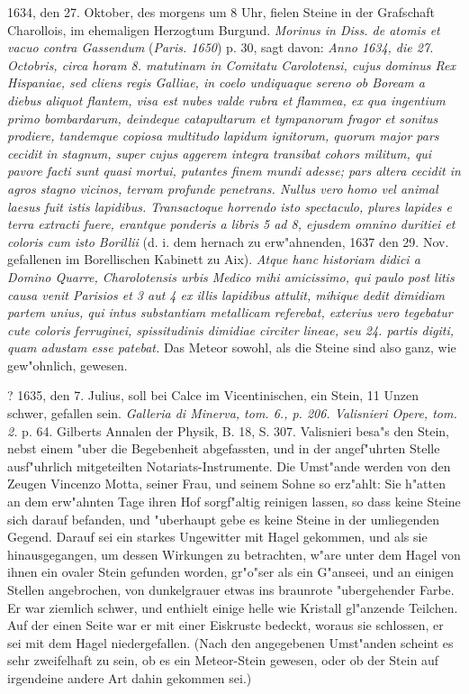 \documentclass[a4paper, 11pt, oneside, polutonikogreek, german]{article}
\begin{document}
1634, den 27. Oktober, des morgens um 8 Uhr, fielen Steine in der Grafschaft Charollois, im ehemaligen Herzogtum Burgund. \emph{Morinus in Diss. de atomis et vacuo contra Gassendum} (\emph{Paris. 1650}) p. 30, sagt davon: \emph{Anno 1634, die 27. Octobris, circa horam 8. matutinam in Comitatu Carolotensi, cujus dominus Rex Hispaniae, sed cliens regis Galliae, in coelo undiquaque sereno ob Boream a diebus aliquot flantem, visa est nubes valde rubra et flammea, ex qua ingentium primo bombardarum, deindeque catapultarum et tympanorum fragor et sonitus prodiere, tandemque copiosa multitudo lapidum ignitorum, quorum major pars cecidit in stagnum, super cujus aggerem integra transibat cohors militum, qui pavore facti sunt quasi mortui, putantes finem mundi adesse; pars altera cecidit in agros stagno vicinos, terram profunde penetrans. Nullus vero homo vel animal laesus fuit istis lapidibus. Transactoque horrendo isto spectaculo, plures lapides e terra extracti fuere, erantque ponderis a libris 5 ad 8, ejusdem omnino duritiei et coloris cum isto Borillii} (d. i. dem hernach zu erw"ahnenden, 1637 den 29. Nov. gefallenen im Borellischen Kabinett zu Aix). \emph{Atque hanc historiam didici a Domino Quarre, Charolotensis urbis Medico mihi amicissimo, qui paulo post litis causa venit Parisios et 3 aut 4 ex illis lapidibus attulit, mihique dedit dimidiam partem unius, qui intus substantiam metallicam referebat, exterius vero tegebatur cute coloris ferruginei, spissitudinis dimidiae circiter lineae, seu 24. partis digiti, quam adustam esse patebat.} Das Meteor sowohl, als die Steine sind also ganz, wie gew"ohnlich, gewesen.

? 1635, den 7. Julius, soll bei Calce im Vicentinischen, ein Stein, 11 Unzen schwer, gefallen sein. \emph{Galleria di Minerva, tom. 6., p. 206. Valisnieri Opere, tom. 2.} p. 64. Gilberts Annalen der Physik, B. 18, S. 307. Valisnieri besa"s den Stein, nebst einem "uber die Begebenheit abgefassten, und in der angef"uhrten Stelle ausf"uhrlich mitgeteilten Notariats-Instrumente. Die Umst"ande werden von den Zeugen Vincenzo Motta, seiner Frau, und seinem Sohne so erz"ahlt: Sie h"atten an dem erw"ahnten Tage ihren Hof sorgf"altig reinigen lassen, so dass keine Steine sich darauf befanden, und "uberhaupt gebe es keine Steine in der umliegenden Gegend. Darauf sei ein starkes Ungewitter mit Hagel gekommen, und als sie hinausgegangen, um dessen Wirkungen zu betrachten, w"are unter dem Hagel von ihnen ein ovaler Stein gefunden worden, gr"o"ser als ein G"anseei, und an einigen Stellen angebrochen, von dunkelgrauer etwas ins braunrote "ubergehender Farbe. Er war ziemlich schwer, und enthielt einige helle wie Kristall gl"anzende Teilchen. Auf der einen Seite war er mit einer Eiskruste bedeckt, woraus sie schlossen, er sei mit dem Hagel niedergefallen. (Nach den angegebenen Umst"anden scheint es sehr zweifelhaft zu sein, ob es ein Meteor-Stein gewesen, oder ob der Stein auf irgendeine andere Art dahin gekommen sei.)
\end{document}
